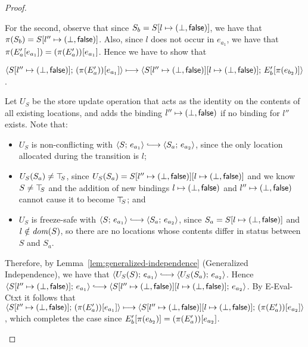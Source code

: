 \begin{proof}
\begin{enumerate}
\begin{enumerate}
\begin{itemize}
          For the second, observe that since $S_b =
          S[l \mapsto (\bot, \textsf{false})]$, we have that $\pi(S_b) =
          S[l'' \mapsto (\bot, \textsf{false})]$.  Also, since $l$ does not occur in
          $e_{a_1}$, we have that $\pi(E'_a\hspace{-0.5mm}\left[e_{a_1}\right]) =
          (\pi(E'_a))\hspace{-0.5mm}\left[e_{a_1}\right]$.  Hence we have to show that

          $\langle S[l'' \mapsto (\bot, \textsf{false})];\, (\pi(E'_a))\hspace{-0.5mm}\left[e_{a_1}\right] \rangle
          \longmapsto
          \langle S[l'' \mapsto (\bot, \textsf{false})][l \mapsto (\bot, \textsf{false})];\, E'_b\hspace{-0.5mm}\left[\pi(e_{b_2})\right] \rangle$.

          Let $U_S$ be the store update operation that acts as the
          identity on the contents of all existing locations, and adds
          the binding $l'' \mapsto (\bot, \textsf{false})$ if no
          binding for $l''$ exists.  Note that:
          \begin{itemize}
          \item $U_S$ is non-conflicting with $\config{S}{e_{a_1}}
            \parstepsto \config{S_a}{e_{a_2}}$, since the only
            location allocated during the transition is $l$;
          \item $U_S(S_a) \neq \top\hspace{-0.85mm}_{S}$, since $U_S(S_a) =
            S[l'' \mapsto (\bot, \textsf{false})][l \mapsto (\bot, \textsf{false})]$
            and we know $S \neq \top\hspace{-0.85mm}_{S}$ and the addition of new
            bindings $l \mapsto (\bot, \textsf{false})$ and
            $l'' \mapsto (\bot, \textsf{false})$ cannot cause it
            to become $\top\hspace{-0.85mm}_{S}$; and
          \item $U_S$ is freeze-safe with $\config{S}{e_{a_1}}
            \parstepsto \config{S_a}{e_{a_2}}$, since $S_a =
            S[l \mapsto (\bot, \textsf{false})]$ and $l \notin \mathit{dom}(S)$,
            so there are no locations whose contents differ in status
            between $S$ and $S_a$.
          \end{itemize}

          Therefore, by Lemma~\ref{lem:generalized-independence}
          (Generalized Independence), we have that
          $\config{U_S(S)}{e_{a_1}} \parstepsto
          \config{U_S(S_a)}{e_{a_2}}$.  Hence
          $\config{\extS{S}{l''}{\bot}{\frozenfalse}}{e_{a_1}}
          \parstepsto
          \config{\extS{\extS{S}{l''}{\bot}{\frozenfalse}}{l}{\bot}{\frozenfalse}}{e_{a_2}}$.
          By {\sc E-Eval-Ctxt} it follows that
          $\langle S[l'' \mapsto (\bot, \textsf{false})];\, (\pi(E'_a))\hspace{-0.5mm}\left[e_{a_1}\right] \rangle
          \longmapsto
          \langle S[l'' \mapsto (\bot, \textsf{false})][l \mapsto (\bot, \textsf{false})];\, (\pi(E'_a))\hspace{-0.5mm}\left[e_{a_2}\right] \rangle$,
          which completes the case since
          $E'_b\hspace{-0.5mm}\left[\pi(e_{b_2})\right] =
          (\pi(E'_a))\hspace{-0.5mm}\left[e_{a_2}\right]$.


\end{itemize}
\end{enumerate}
\end{enumerate}
\end{proof}
